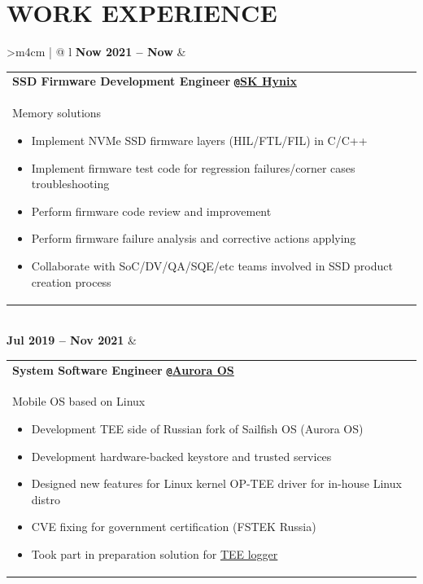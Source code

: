 \documentclass{anisyan-resume}
\begin{document}
	\section{\textbf{WORK EXPERIENCE}}
	\vspace{5pt}
	\renewcommand\arraystretch{0.5}
	\begin{tabularx}{\textwidth}{>{\quad}m{4cm} | @{\timelinebullet} l}
		\normalsize\textbf{Now 2021 -- Now}
		&
		\renewcommand\arraystretch{1}
		\begin{tabular}[t]{ p{15cm} }
		\large{\textbf{SSD Firmware Development Engineer}} \texttt{\textbf{@}}\href{https://skhms.by/en/sk-hynix-development-center-in-minsk/}{\textbf{SK Hynix}}\\
		\normalsize{Memory solutions}
		\renewcommand\labelitemi{{\boldmath$\cdot$}}
			\begin{itemize}[noitemsep, topsep=5pt, parsep=0pt, partopsep=0pt]
				\item {\small Implement NVMe SSD firmware layers (HIL/FTL/FIL) in C/C++}
				\item {\small Implement firmware test code for regression failures/corner cases troubleshooting}
				\item {\small Perform firmware code review and improvement}
				\item {\small Perform firmware failure analysis and corrective actions applying}
				\item {\small Collaborate with SoC/DV/QA/SQE/etc teams involved in SSD product creation process}
			\end{itemize}
		\end{tabular} \\

		\normalsize\textbf{Jul 2019 -- Nov 2021}
		&
		\renewcommand\arraystretch{1}
		\begin{tabular}[t]{ p{15cm} }
			\large{\textbf{System Software Engineer}} \texttt{\textbf{@}}\href{https://auroraos.ru/}{\textbf{Aurora OS}} \\
			\normalsize{Mobile OS based on Linux}
			\renewcommand\labelitemi{{\boldmath$\cdot$}}
			\begin{itemize}[noitemsep, topsep=5pt, parsep=0pt, partopsep=0pt]
				\item {\small Development TEE side of Russian fork of Sailfish OS (Aurora OS)}
				\item {\small Development hardware-backed keystore and trusted services}
				\item {\small Designed new features for Linux kernel OP-TEE driver for in-house Linux distro}
				\item {\small CVE fixing for government certification (FSTEK Russia)}
				\item {\small Took part in preparation solution for \href{https://github.com/OP-TEE/optee_os/issues/4230}{TEE logger}}
			\end{itemize}
		\end{tabular} \\


\end{tabularx}
\end{document}
